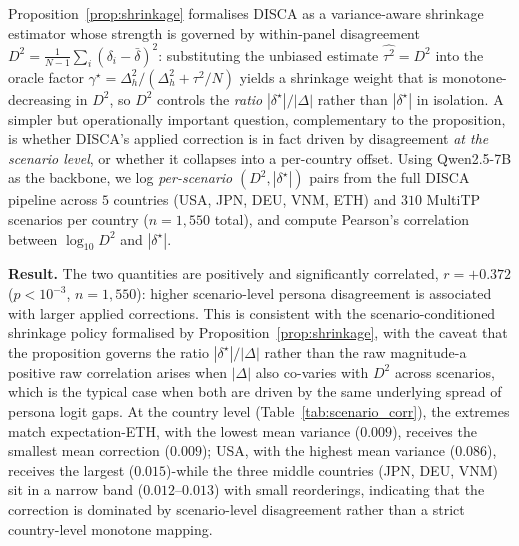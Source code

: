\documentclass{article}
\begin{document}
Proposition~\ref{prop:shrinkage} formalises DISCA as a variance-aware shrinkage estimator whose strength is governed by within-panel disagreement $D^2 = \tfrac{1}{N-1}\sum_i (\delta_i - \bar\delta)^2$: substituting the unbiased estimate $\widehat{\tau^2}=D^2$ into the oracle factor $\gamma^\star = \Delta_h^2 / (\Delta_h^2 + \tau^2/N)$ yields a shrinkage weight that is monotone-decreasing in $D^2$, so $D^2$ controls the \emph{ratio} $|\delta^\star|/|\Delta|$ rather than $|\delta^\star|$ in isolation. A simpler but operationally important question, complementary to the proposition, is whether DISCA's applied correction is in fact driven by disagreement \emph{at the scenario level}, or whether it collapses into a per-country offset. Using Qwen2.5-7B as the backbone, we log \emph{per-scenario} $(D^2, |\delta^\star|)$ pairs from the full DISCA
pipeline across $5$ countries (USA, JPN, DEU, VNM, ETH) and
$310$ MultiTP scenarios per country ($n=1{,}550$ total), and compute Pearson's correlation between $\log_{10} D^2$ and $|\delta^\star|$.

\textbf{Result.} The two quantities are positively and significantly correlated, $r = +0.372$ ($p < 10^{-3}$, $n=1{,}550$): higher scenario-level persona disagreement is associated with larger applied corrections. This is consistent with the scenario-conditioned shrinkage policy formalised by Proposition~\ref{prop:shrinkage}, with the caveat that the proposition governs the ratio $|\delta^\star|/|\Delta|$ rather than the raw magnitude-a positive raw correlation arises when $|\Delta|$ also co-varies with $D^2$ across scenarios, which is the typical case when both are driven by the same underlying spread of persona logit gaps. At the country level (Table~\ref{tab:scenario_corr}), the extremes match expectation-ETH, with the lowest mean variance ($0.009$), receives the smallest mean correction ($0.009$); USA, with the highest mean variance ($0.086$), receives the largest ($0.015$)-while the three middle countries (JPN, DEU, VNM) sit in a narrow band ($0.012$--$0.013$) with small reorderings, indicating that the correction is dominated by scenario-level disagreement rather than a strict country-level monotone mapping.
\end{document}
